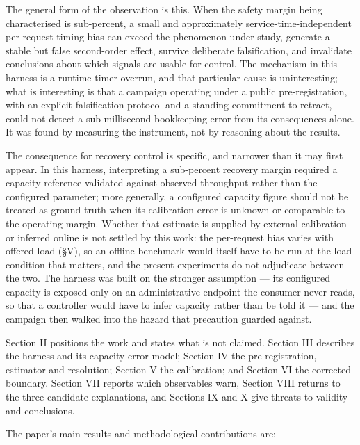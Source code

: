 \documentclass{ieeeaccess}
\begin{document}
The general form of the observation is this. When the safety margin being characterised is sub-percent, a small and approximately service-time-independent per-request timing bias can exceed the phenomenon under study, generate a stable but false second-order effect, survive deliberate falsification, and invalidate conclusions about which signals are usable for control. The mechanism in this harness is a runtime timer overrun, and that particular cause is uninteresting; what is interesting is that a campaign operating under a public pre-registration, with an explicit falsification protocol and a standing commitment to retract, could not detect a sub-millisecond bookkeeping error from its consequences alone. It was found by measuring the instrument, not by reasoning about the results.

The consequence for recovery control is specific, and narrower than it may first appear. In this harness, interpreting a sub-percent recovery margin required a capacity reference validated against observed throughput rather than the configured parameter; more generally, a configured capacity figure should not be treated as ground truth when its calibration error is unknown or comparable to the operating margin. Whether that estimate is supplied by external calibration or inferred online is not settled by this work: the per-request bias varies with offered load (\S{}V), so an offline benchmark would itself have to be run at the load condition that matters, and the present experiments do not adjudicate between the two. The harness was built on the stronger assumption --- its configured capacity is exposed only on an administrative endpoint the consumer never reads, so that a controller would have to infer capacity rather than be told it --- and the campaign then walked into the hazard that precaution guarded against.

Section II positions the work and states what is not claimed. Section III describes the harness and its capacity error model; Section IV the pre-registration, estimator and resolution; Section V the calibration; and Section VI the corrected boundary. Section VII reports which observables warn, Section VIII returns to the three candidate explanations, and Sections IX and X give threats to validity and conclusions.

The paper's main results and methodological contributions are:
\end{document}
